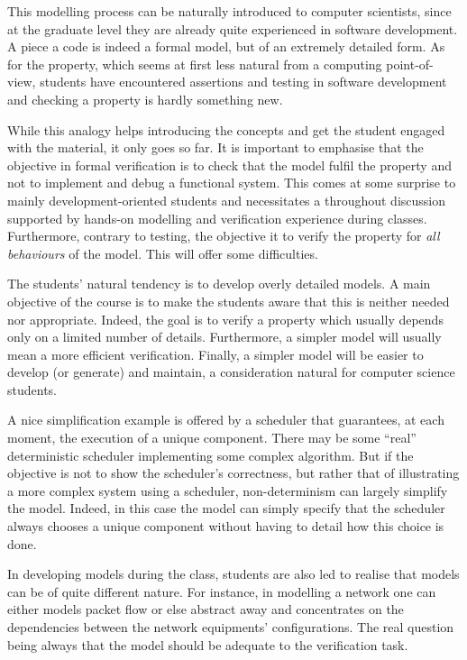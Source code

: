\documentclass[a4paper,UKenglish]{lipics}
\begin{document}
This modelling process can be naturally introduced to computer scientists, since at the graduate level they are already quite experienced in software development. A piece a code is indeed a formal model, but of an extremely detailed form. As for the property, which seems at first less natural from a computing point-of-view, students have encountered assertions and testing in software development and checking a property is hardly something new.

While this analogy helps introducing the concepts and get the student engaged with the material, it only goes so far. It is important to emphasise that the objective in formal verification is to check that the model fulfil the property and not to implement and debug a functional system. This comes at some surprise to mainly development-oriented students and necessitates a throughout discussion supported by hands-on modelling and verification experience during classes. Furthermore, contrary to testing, the objective it to verify the property for \emph{all behaviours} of the model. This will offer some difficulties.

The students' natural tendency is to develop overly detailed models. A main objective of the course is to make the students aware that this is neither needed nor appropriate. Indeed, the goal is to verify a property which usually depends only on a limited number of details. Furthermore, a simpler model will usually mean a more efficient verification. Finally, a simpler model will be easier to develop (or generate) and maintain, a consideration natural for computer science students.

A nice simplification example is offered by a scheduler that guarantees, at each moment, the execution of a unique component. There may be some ``real'' deterministic scheduler implementing some complex algorithm. But if the objective is not to show the scheduler's correctness, but rather that of illustrating a more complex system using a scheduler, non-determinism can largely simplify the model. Indeed, in this case the model can simply specify that the scheduler always chooses a unique component without having to detail how this choice is done.

In developing models during the class, students are also led to realise that models can be of quite different nature. For instance, in modelling a network one can either models packet flow or else abstract away and concentrates on the dependencies between the network equipments' configurations. The real question being always that the model should be adequate to the verification task.
\end{document}
